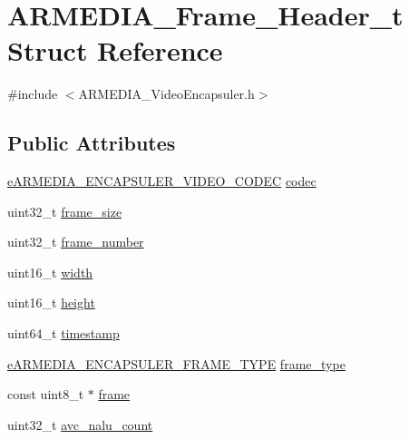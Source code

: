 \hypertarget{struct_a_r_m_e_d_i_a___frame___header__t}{}\section{A\+R\+M\+E\+D\+I\+A\+\_\+\+Frame\+\_\+\+Header\+\_\+t Struct Reference}
\label{struct_a_r_m_e_d_i_a___frame___header__t}


{\ttfamily \#include $<$A\+R\+M\+E\+D\+I\+A\+\_\+\+Video\+Encapsuler.\+h$>$}

\subsection*{Public Attributes}
\begin{DoxyCompactItemize}
\item 
\hyperlink{_a_r_m_e_d_i_a___video_encapsuler_8h_aea3038113e24f11f9c807b4e2acb071d}{e\+A\+R\+M\+E\+D\+I\+A\+\_\+\+E\+N\+C\+A\+P\+S\+U\+L\+E\+R\+\_\+\+V\+I\+D\+E\+O\+\_\+\+C\+O\+D\+EC} \hyperlink{struct_a_r_m_e_d_i_a___frame___header__t_aa5c73624195f74c5db2003c07bbf5a3b}{codec}
\item 
uint32\+\_\+t \hyperlink{struct_a_r_m_e_d_i_a___frame___header__t_a495fb0b75642a87e4a9f8a57c0683af9}{frame\+\_\+size}
\item 
uint32\+\_\+t \hyperlink{struct_a_r_m_e_d_i_a___frame___header__t_aa8ba810dcd28e67c68a27ac443723211}{frame\+\_\+number}
\item 
uint16\+\_\+t \hyperlink{struct_a_r_m_e_d_i_a___frame___header__t_a85e958b21feca7b4ca2d3c72a6ea0311}{width}
\item 
uint16\+\_\+t \hyperlink{struct_a_r_m_e_d_i_a___frame___header__t_a2c931e1f7ef301344623a7fa25259ab5}{height}
\item 
uint64\+\_\+t \hyperlink{struct_a_r_m_e_d_i_a___frame___header__t_a97bcb9c81ee1d508329b2e3e6ef3bd5b}{timestamp}
\item 
\hyperlink{_a_r_m_e_d_i_a___video_encapsuler_8h_ae81a42fad69cee3ac6052492195ec705}{e\+A\+R\+M\+E\+D\+I\+A\+\_\+\+E\+N\+C\+A\+P\+S\+U\+L\+E\+R\+\_\+\+F\+R\+A\+M\+E\+\_\+\+T\+Y\+PE} \hyperlink{struct_a_r_m_e_d_i_a___frame___header__t_a5f2fd4cbbc86cdfb657964b6ebb64226}{frame\+\_\+type}
\item 
const uint8\+\_\+t $\ast$ \hyperlink{struct_a_r_m_e_d_i_a___frame___header__t_a7284260a8344b610f4a01a25905480ca}{frame}
\item 
uint32\+\_\+t \hyperlink{struct_a_r_m_e_d_i_a___frame___header__t_abb33cc8e56d52779c27c799c15e5eaac}{avc\+\_\+nalu\+\_\+count}

\end{DoxyCompactItemize}
